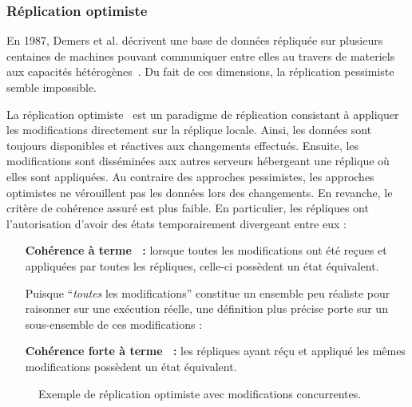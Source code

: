 \subsubsection{Réplication optimiste}
\label{repl:subsubsec:optimistic}

En 1987, Demers et al. décrivent une base de données répliquée sur plusieurs
centaines de machines pouvant communiquer entre elles au travers de materiels
aux capacités hétérogènes~\cite{demers1987epidemic}. Du fait de ces dimensions,
la réplication pessimiste semble impossible.

La réplication optimiste~\cite{johnson1975maintenance, saito2005optimistic} est
un paradigme de réplication consistant à appliquer les modifications directement
sur la réplique locale.  Ainsi, les données sont toujours disponibles et
réactives aux changements effectués. Ensuite, les modifications sont disséminées
aux autres serveurs hébergeant une réplique où elles sont appliquées. Au
contraire des approches pessimistes, les approches optimistes ne vérouillent pas
les données lors des changements. En revanche, le critère de cohérence assuré
est plus faible. En particulier, les répliques ont l'autorisation d'avoir des
états temporairement divergeant entre eux :

\begin{itemize}
\item [\textbf{Cohérence à terme~\cite{bailis2013eventual} :}] lorsque toutes
  les modifications ont été reçues et appliquées par toutes les répliques,
  celle-ci possèdent un état équivalent.

  Puisque ``\emph{toutes} les modifications'' constitue un ensemble peu réaliste
  pour raisonner sur une exécution réelle, une définition plus précise porte sur
  un sous-ensemble de ces modifications :
\item [\textbf{Cohérence forte à terme~\cite{shapiro2011conflict} :}] les
  répliques ayant réçu et appliqué les mêmes modifications possèdent un état
  équivalent.
\end{itemize}

\begin{figure*}
  \centering
  \hspace{10pt}
  \caption{\label{repl:fig:optimisticexample} Exemple de réplication optimiste
    avec modifications concurrentes.}
\end{figure*}



